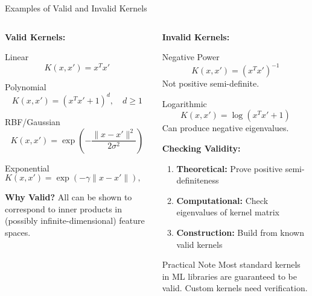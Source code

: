 \documentclass[8pt,aspectratio=1610]{beamer}
\begin{document}
\begin{frame}{Examples of Valid and Invalid Kernels}
\begin{columns}[t]
\begin{column}{0.48\textwidth}
\textbf{Valid Kernels:}
\vspace{0.2cm}

\begin{block}{Linear}
$$K(x, x') = x^T x'$$
\end{block}

\begin{block}{Polynomial}
$$K(x, x') = (x^T x' + 1)^d, \quad d \geq 1$$
\end{block}

\begin{block}{RBF/Gaussian}
$$K(x, x') = \exp\left(-\frac{\|x - x'\|^2}{2\sigma^2}\right)$$
\end{block}

\begin{block}{Exponential}
$$K(x, x') = \exp(-\gamma \|x - x'\|), \quad \gamma > 0$$
\end{block}

\vspace{0.3cm}
\textbf{Why Valid?}
All can be shown to correspond to inner products in (possibly infinite-dimensional) feature spaces.
\end{column}

\begin{column}{0.48\textwidth}
\textbf{Invalid Kernels:}
\vspace{0.2cm}

\begin{block}{Negative Power}
$$K(x, x') = (x^T x')^{-1}$$
Not positive semi-definite.
\end{block}

\begin{block}{Logarithmic}
$$K(x, x') = \log(x^T x' + 1)$$
Can produce negative eigenvalues.
\end{block}

\vspace{0.3cm}
\textbf{Checking Validity:}
\vspace{0.2cm}

\begin{enumerate}
\setlength{\itemsep}{1pt}
\item \textbf{Theoretical:} Prove positive semi-definiteness
\item \textbf{Computational:} Check eigenvalues of kernel matrix
\item \textbf{Construction:} Build from known valid kernels
\end{enumerate}

\vspace{0.3cm}
\begin{alertblock}{Practical Note}
Most standard kernels in ML libraries are guaranteed to be valid. Custom kernels need verification.
\end{alertblock}
\end{column}
\end{columns}
\end{frame}
\end{document}
